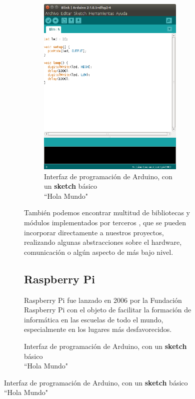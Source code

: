 \begin{itemize}
\begin{itemize}
\begin{figure}[h]
\begin{figure}[h]
\begin{figure}
\centering
\includegraphics[width=0.9\linewidth]{../images/arduinoide}
\caption[Interfaz de programación de Arduino]{Interfaz de programación de Arduino, con un \textbf{sketch} básico \\ ``Hola Mundo" }
\label{fig:arduinoide}
\end{figure}


También podemos encontrar multitud de bibliotecas y módulos implementados por terceros \cite{arduino_libraries}, que se pueden incorporar directamente a nuestros proyectos, realizando algunas abstracciones sobre el hardware, comunicación o algún aspecto de más bajo nivel.




\subsection{Raspberry Pi}


Raspberry Pi \cite{raspberry} fue lanzado en 2006 por la Fundación Raspberry Pi con el objeto de facilitar la formación de informática en las escuelas de todo el mundo, especialmente en los lugares más desfavorecidos.


\end{figure}
\end{figure}
\end{itemize}
\end{itemize}
